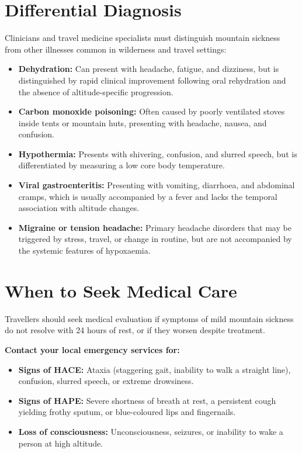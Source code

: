 \section*{Differential Diagnosis}
Clinicians and travel medicine specialists must distinguish mountain sickness from other illnesses common in wilderness and travel settings:
\begin{itemize}
    \item \textbf{Dehydration:} Can present with headache, fatigue, and dizziness, but is distinguished by rapid clinical improvement following oral rehydration and the absence of altitude-specific progression.
    \item \textbf{Carbon monoxide poisoning:} Often caused by poorly ventilated stoves inside tents or mountain huts, presenting with headache, nausea, and confusion.
    \item \textbf{Hypothermia:} Presents with shivering, confusion, and slurred speech, but is differentiated by measuring a low core body temperature.
    \item \textbf{Viral gastroenteritis:} Presenting with vomiting, diarrhoea, and abdominal cramps, which is usually accompanied by a fever and lacks the temporal association with altitude changes.
    \item \textbf{Migraine or tension headache:} Primary headache disorders that may be triggered by stress, travel, or change in routine, but are not accompanied by the systemic features of hypoxaemia.
\end{itemize}

\section*{When to Seek Medical Care}
Travellers should seek medical evaluation if symptoms of mild mountain sickness do not resolve with 24 hours of rest, or if they worsen despite treatment.

\textbf{Contact your local emergency services for:}
\begin{itemize}
    \item \textbf{Signs of HACE:} Ataxia (staggering gait, inability to walk a straight line), confusion, slurred speech, or extreme drowsiness.
    \item \textbf{Signs of HAPE:} Severe shortness of breath at rest, a persistent cough yielding frothy sputum, or blue-coloured lips and fingernails.
    \item \textbf{Loss of consciousness:} Unconsciousness, seizures, or inability to wake a person at high altitude.
\end{itemize}

